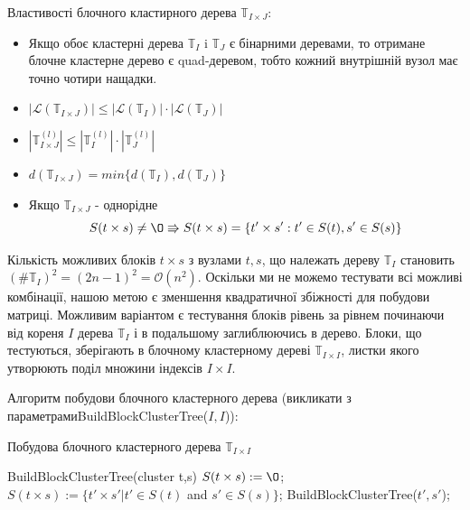 \documentclass[12pt]{report}
\begin{document}
	\par Властивості блочного кластирного дерева $\mathbb{T}_{I\times J}$:
	\begin{itemize}
		\item Якщо обоє кластерні дерева $\mathbb{T}_I$ i  $\mathbb{T}_J$ є бінарними деревами, то отримане блочне кластерне дерево є quad-деревом, тобто кожний внутрішній вузол має точно чотири нащадки.
		\item $|\mathcal{L}(\mathbb{T}_{I\times J})|\le |\mathcal{L}(\mathbb{T}_I)|\cdot |\mathcal{L}(\mathbb{T}_J)|$
		\item $|\mathbb{T}_{I\times J}^{(l)}|\le |\mathbb{T}_I^{(l)}|\cdot |\mathbb{T}_J^{(l)}|$
		\item $d(\mathbb{T}_{I\times J})=min\{d(\mathbb{T}_I),d(\mathbb{T}_J)\}$
		\item Якщо $\mathbb{T}_{I\times J}$ - однорідне 
		$$S(t\times s) \not=\O\Rrightarrow S(t\times s) =\{t'\times s' : t' \in S(t),s' \in S(s)\} $$
	\end{itemize}
	
	\par Кількість можливих блоків $t\times s$ з вузлами $t,s$, що належать дереву $\mathbb{T}_I$ становить $(\#\mathbb{T}_I)^2=(2n-1)^2=\mathcal{O}(n^2)$. Оскільки ми не можемо тестувати всі можливі комбінації, нашою метою є зменшення квадратичної збіжності для побудови матриці. Можливим варіантом є тестування блоків рівень за рівнем починаючи від кореня $I$ дерева $\mathbb{T}_I$ і в подальшому заглиблюючись в дерево. Блоки, що тестуються, зберігають в блочному кластерному дереві $\mathbb{T}_{I\times I}$, листки якого утворюють поділ множини індексів $I\times I$. \par Алгоритм побудови блочного кластерного дерева (викликати з параметрами\newline BuildBlockClusterTree($I,I$)):
	\begin{algorithm}
	\caption{Побудова блочного кластерного дерева $\mathbb{T}_{I\times I}$}
	\begin{algorithmic}
	 BuildBlockClusterTree(cluster t,s)
	\STATE $S(t\times s):=\O$;
	\ELSE
	\STATE $S(t\times s):=\{t'\times s'|t'\in S(t)$ and $s'\in S(s)\}$;
	\STATE BuildBlockClusterTree($t',s'$);
	\ENDFOR
	\ENDIF
	\end{algorithmic}

	\end{algorithm}
	\newpage
\end{document}
